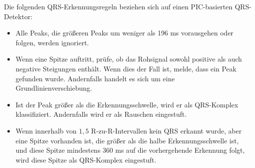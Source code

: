 \documentclass[a4paper,12pt,titlepage]{scrartcl}
\begin{document}
Die folgenden QRS-Erkennungsregeln beziehen sich auf einen PIC-basierten QRS-Detektor:
\begin{itemize}
    \item Alle Peaks, die größeren Peaks um weniger als 196 ms vorausgehen oder folgen, werden ignoriert.
    \item Wenn eine Spitze auftritt, prüfe, ob das Rohsignal sowohl positive als auch negative Steigungen enthält. Wenn dies der Fall ist, melde, dass ein Peak gefunden wurde. Andernfalls handelt es sich um eine Grundlinienverschiebung.
    \item Ist der Peak größer als die Erkennungsschwelle, wird er als QRS-Komplex klassifiziert. Andernfalls wird er als Rauschen eingestuft.
    \item Wenn innerhalb von $1,5$ R-zu-R-Intervallen kein QRS erkannt wurde, aber eine Spitze vorhanden ist, die größer als die halbe Erkennungsschwelle ist, und diese Spitze mindestens 360 ms auf die vorhergehende Erkennung folgt, wird diese Spitze als QRS-Komplex eingestuft.
\end{itemize}
\end{document}
